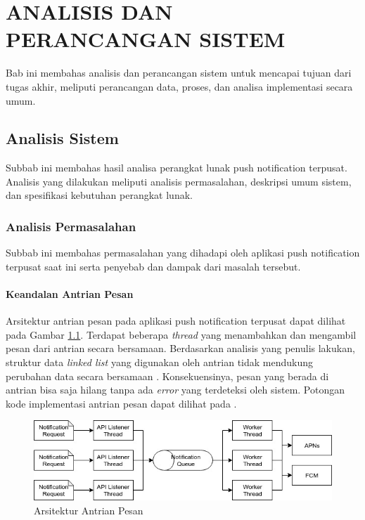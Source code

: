\chapter{ANALISIS DAN PERANCANGAN SISTEM}
\par Bab ini membahas analisis dan perancangan sistem untuk mencapai tujuan dari tugas akhir, meliputi perancangan data, proses, dan analisa implementasi secara umum.

\section{Analisis Sistem}
\par Subbab ini membahas hasil analisa perangkat lunak push notification terpusat.
Analisis yang dilakukan meliputi analisis permasalahan, deskripsi umum sistem, dan spesifikasi kebutuhan perangkat lunak.

\subsection{Analisis Permasalahan}
\par Subbab ini membahas permasalahan yang dihadapi oleh aplikasi push notification terpusat saat ini serta penyebab dan dampak dari masalah tersebut.

\subsubsection{Keandalan Antrian Pesan}
\par Arsitektur antrian pesan pada aplikasi push notification terpusat dapat dilihat pada Gambar \ref{arsitektur_message_queue_lama}. Terdapat beberapa \textit{thread} yang menambahkan dan mengambil pesan dari antrian secara bersamaan. Berdasarkan analisis yang penulis lakukan, struktur data \textit{linked list} yang digunakan oleh antrian tidak mendukung perubahan data secara bersamaan \cite{linkedlist-online}. Konsekuensinya, pesan yang berada di antrian bisa saja hilang tanpa ada \textit{error} yang terdeteksi oleh sistem. Potongan kode implementasi antrian pesan dapat dilihat pada .
\begin{figure}[H]
	\caption{Arsitektur Antrian Pesan} \label{arsitektur_message_queue_lama}
	\includegraphics[width=1\textwidth]{bab3/figures/arsitektur_message_queue_lama.jpg}
\end{figure}

